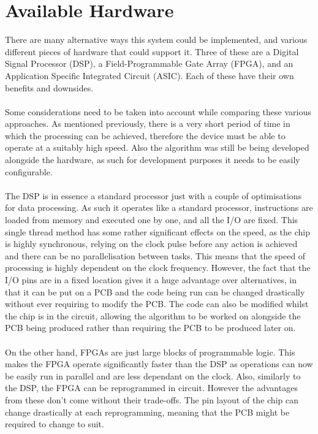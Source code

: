 \section{Available Hardware}
There are many alternative ways this system could be implemented, and various different pieces of hardware that could support it.
Three of these are a Digital Signal Processor (DSP), a Field-Programmable Gate Array (FPGA), and an Application Specific Integrated Circuit (ASIC).
Each of these have their own benefits and downsides.
\\
\\
Some considerations need to be taken into account while comparing these various approaches.
As mentioned previously, there is a very short period of time in which the processing can be achieved, therefore the device must be able to operate at a suitably high speed.
Also the algorithm was still be being developed alongside the hardware, as such for development purposes it needs to be easily configurable.
\\
\\
The DSP is in essence a standard processor just with a couple of optimisations for data processing. 
As such it operates like a standard processor, instructions are loaded from memory and executed one by one, and all the I/O are fixed.
This single thread method has some rather significant effects on the speed, as the chip is highly synchronous, relying on the clock pulse before any action is achieved and there can be no parallelisation between tasks.
This means that the speed of processing is highly dependent on the clock frequency.
However, the fact that the I/O pins are in a fixed location gives it a huge advantage over alternatives, in that it can be put on a PCB and the code being run can be changed drastically without ever requiring to modify the PCB.
The code can also be modified whilst the chip is in the circuit, allowing the algorithm to be worked on alongside the PCB being produced rather than requiring the PCB to be produced later on.
\\
\\
On the other hand, FPGAs are just large blocks of programmable logic.
This makes the FPGA operate significantly faster than the DSP as operations can now be easily run in parallel and are less dependant on the clock.
Also, similarly to the DSP, the FPGA can be reprogrammed in circuit.
However the advantages from these don't come without their trade-offs.
The pin layout of the chip can change drastically at each reprogramming, meaning that the PCB might be required to change to suit.

